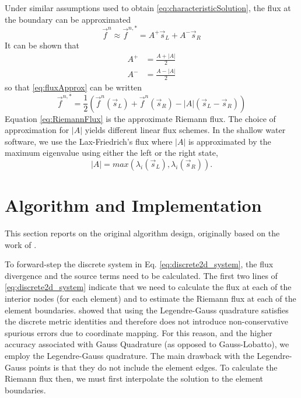 \documentclass{softwaremanual}
\begin{document}
Under similar assumptions used to obtain \eqref{eq:characteristicSolution}, the flux at the boundary can be approximated
\begin{equation}
\vec{f}^n \approx \vec{f}^{n,*} = A^{+}\vec{s}_L + A^{-}\vec{s}_R  \label{eq:fluxApprox}
\end{equation}
It can be shown that
\begin{subequations}
\begin{align}
A^{+} &= \frac{A+|A|}{2} \\
A^{-} &= \frac{A-|A|}{2}
\end{align}
\end{subequations}
so that \eqref{eq:fluxApprox} can be written
\begin{equation}
\vec{f}^{n,*} = \frac{1}{2}\left( \vec{f}^n(\vec{s}_L) + \vec{f}^n(\vec{s}_R) -|A|(\vec{s}_L - \vec{s}_R) \right)\label{eq:RiemannFlux}
\end{equation}
Equation \eqref{eq:RiemannFlux} is the approximate Riemann flux. The choice of approximation for $|A|$ yields different linear flux schemes. In the shallow water software, we use the Lax-Friedrich's flux where $|A|$ is approximated by the maximum eigenvalue using either the left or the right state,
\begin{equation}
|A| = max( \lambda_i(\vec{s}_L), \lambda_i(\vec{s}_R) ).
\end{equation}

\section{Algorithm and Implementation}

This section reports on the original algorithm design, originally based on the work of \citet{Kopriva2009}.

To forward-step the discrete system in Eq. \eqref{eq:discrete2d_system}, the flux divergence and the source terms need to be calculated. The first two lines of \eqref{eq:discrete2d_system} indicate that we need to calculate the flux at each of the interior nodes (for each element) and to estimate the Riemann flux at each of the element boundaries. \citep{Kopriva2009} showed that using the Legendre-Gauss quadrature satisfies the discrete metric identities and therefore does not introduce non-conservative spurious errors due to coordinate mapping. For this reason, and the higher accuracy associated with Gauss Quadrature (as opposed to Gauss-Lobatto), we employ the Legendre-Gauss quadrature. The main drawback with the Legendre-Gauss points is that they do not include the element edges. To calculate the Riemann flux then, we must first interpolate the solution to the element boundaries.
\end{document}
